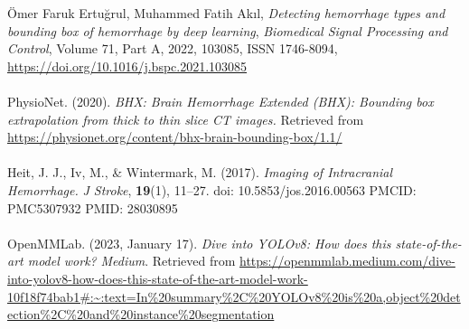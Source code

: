\documentclass[Print]{../Style/isecure-v24}
\begin{document}
\begin{thebibliography}{9}  %

Ömer Faruk Ertuğrul, Muhammed Fatih Akıl,
\emph{Detecting hemorrhage types and bounding box of hemorrhage by deep learning},
\emph{Biomedical Signal Processing and Control}, 
Volume 71, Part A, 2022, 103085,
ISSN 1746-8094, \url{https://doi.org/10.1016/j.bspc.2021.103085}\\
\\

PhysioNet. (2020). \emph{BHX: Brain Hemorrhage Extended (BHX): Bounding box extrapolation from thick to thin slice CT images.} Retrieved from \url{https://physionet.org/content/bhx-brain-bounding-box/1.1/}\\
\\

Heit, J. J., Iv, M., \& Wintermark, M. (2017). \emph{Imaging of Intracranial Hemorrhage.} \emph{J Stroke}, \textbf{19}(1), 11–27. doi: 10.5853/jos.2016.00563 PMCID: PMC5307932 PMID: 28030895\\
\\

OpenMMLab. (2023, January 17). \emph{Dive into YOLOv8: How does this state-of-the-art model work?} \emph{Medium}. Retrieved from \url{https://openmmlab.medium.com/dive-into-yolov8-how-does-this-state-of-the-art-model-work-10f18f74bab1#:~:text=In%20summary%2C%20YOLOv8%20is%20a,object%20detection%2C%20and%20instance%20segmentation}



\end{thebibliography}
\end{document}
